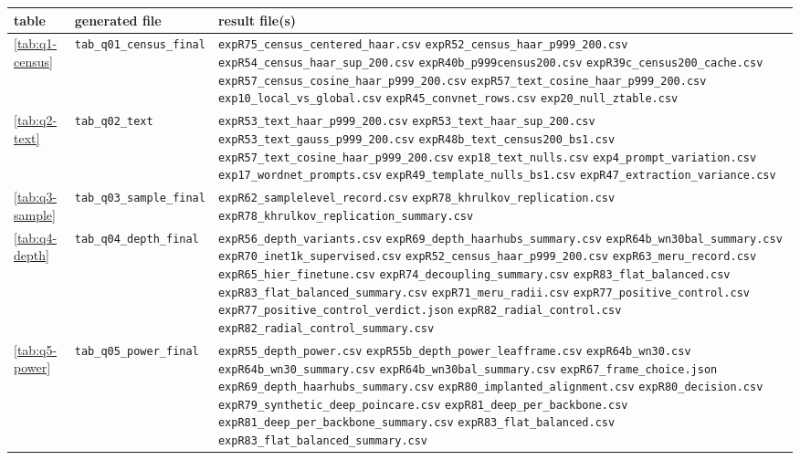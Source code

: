 \begin{table}[tbp]
\centering
\scriptsize
\setlength{\tabcolsep}{3pt}
\begin{tabular}{ll>{\raggedright\arraybackslash}p{9.0cm}}
\toprule
table & generated file & result file(s) \\
\midrule
\ref{tab:q1-census} & \texttt{tab\_q01\_census\_final} & \texttt{expR75\_census\_centered\_haar.csv} \texttt{expR52\_census\_haar\_p999\_200.csv} \texttt{expR54\_census\_haar\_sup\_200.csv} \texttt{expR40b\_p999census200.csv} \texttt{expR39c\_census200\_cache.csv} \texttt{expR57\_census\_cosine\_haar\_p999\_200.csv} \texttt{expR57\_text\_cosine\_haar\_p999\_200.csv} \texttt{exp10\_local\_vs\_global.csv} \texttt{expR45\_convnet\_rows.csv} \texttt{exp20\_null\_ztable.csv} \\
\ref{tab:q2-text} & \texttt{tab\_q02\_text} & \texttt{expR53\_text\_haar\_p999\_200.csv} \texttt{expR53\_text\_haar\_sup\_200.csv} \texttt{expR53\_text\_gauss\_p999\_200.csv} \texttt{expR48b\_text\_census200\_bs1.csv} \texttt{expR57\_text\_cosine\_haar\_p999\_200.csv} \texttt{exp18\_text\_nulls.csv} \texttt{exp4\_prompt\_variation.csv} \texttt{exp17\_wordnet\_prompts.csv} \texttt{expR49\_template\_nulls\_bs1.csv} \texttt{expR47\_extraction\_variance.csv} \\
\ref{tab:q3-sample} & \texttt{tab\_q03\_sample\_final} & \texttt{expR62\_samplelevel\_record.csv} \texttt{expR78\_khrulkov\_replication.csv} \texttt{expR78\_khrulkov\_replication\_summary.csv} \\
\ref{tab:q4-depth} & \texttt{tab\_q04\_depth\_final} & \texttt{expR56\_depth\_variants.csv} \texttt{expR69\_depth\_haarhubs\_summary.csv} \texttt{expR64b\_wn30bal\_summary.csv} \texttt{expR70\_inet1k\_supervised.csv} \texttt{expR52\_census\_haar\_p999\_200.csv} \texttt{expR63\_meru\_record.csv} \texttt{expR65\_hier\_finetune.csv} \texttt{expR74\_decoupling\_summary.csv} \texttt{expR83\_flat\_balanced.csv} \texttt{expR83\_flat\_balanced\_summary.csv} \texttt{expR71\_meru\_radii.csv} \texttt{expR77\_positive\_control.csv} \texttt{expR77\_positive\_control\_verdict.json} \texttt{expR82\_radial\_control.csv} \texttt{expR82\_radial\_control\_summary.csv} \\
\ref{tab:q5-power} & \texttt{tab\_q05\_power\_final} & \texttt{expR55\_depth\_power.csv} \texttt{expR55b\_depth\_power\_leafframe.csv} \texttt{expR64b\_wn30.csv} \texttt{expR64b\_wn30\_summary.csv} \texttt{expR64b\_wn30bal\_summary.csv} \texttt{expR67\_frame\_choice.json} \texttt{expR69\_depth\_haarhubs\_summary.csv} \texttt{expR80\_implanted\_alignment.csv} \texttt{expR80\_decision.csv} \texttt{expR79\_synthetic\_deep\_poincare.csv} \texttt{expR81\_deep\_per\_backbone.csv} \texttt{expR81\_deep\_per\_backbone\_summary.csv} \texttt{expR83\_flat\_balanced.csv} \texttt{expR83\_flat\_balanced\_summary.csv} \\

\end{tabular}
\end{table}
